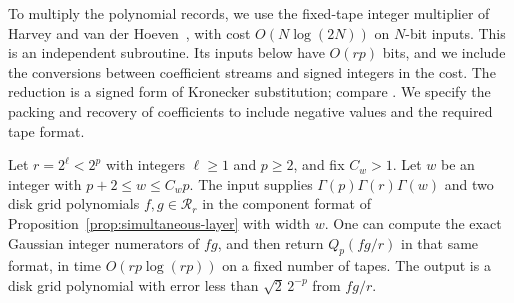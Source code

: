 To multiply the polynomial records, we use the fixed-tape integer
multiplier of Harvey and van der
Hoeven~\cite[Theorem~1.1]{HarveyHoeven2021}, with cost
$O(N\log(2N))$ on $N$-bit inputs.  This is an independent subroutine.
Its inputs below have $O(rp)$ bits, and we include the conversions
between coefficient streams and signed integers in the cost. The
reduction is a signed form of Kronecker substitution; compare
\cite[Lemma~2.5]{HarveyHoeven2021}. We specify the packing and recovery
of coefficients to include negative values and the required tape format.

\begin{lemma}
\label{lem:signed-ring-product}
Let $r=2^\ell<2^p$ with integers $\ell\geq1$ and $p\geq2$, and fix $C_w>1$.
Let $w$ be an integer with $p+2\leq w\leq C_wp$.
The input supplies $\Gamma(p)\Gamma(r)\Gamma(w)$ and two disk grid
polynomials $f,g\in\mathcal R_r$ in the component format of
Proposition~\ref{prop:simultaneous-layer} with width $w$.
One can compute the exact Gaussian integer
numerators of $fg$, and then return $Q_p(fg/r)$ in that same format, in time
$O(rp\log(rp))$ on a fixed number of tapes.  The output is a disk
grid polynomial with error less than $\sqrt2\,2^{-p}$ from $fg/r$.
\end{lemma}
